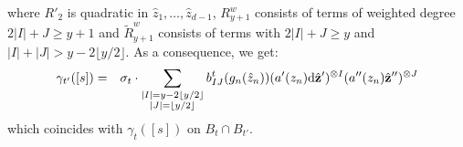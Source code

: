 \documentclass[12pt]{amsart}
\theoremstyle{definition}
\def\dif{{\rm d}}
\def\bz{{\mathbf{z}}}
\begin{document}
where $R'_2$ is quadratic in $\hat{z}_1,\dots, \hat{z}_{d-1}$, $R^w_{y+1}$ consists of terms of weighted degree $2|I|+J\ge y+1$ and $\tilde{R}^w_{y+1}$ consists of terms with $2|I|+J\ge y$ and $|I|+|J|>y-2\lfloor y/2\rfloor$.  
As a consequence, we get:
   \begin{eqnarray*}
    \gamma_{t'}([s])%
    &=&\sigma_t\cdot \sum_{\substack{|I|=y-2\lfloor y/2\rfloor\\ |J|=\lfloor y/2\rfloor}}b^t_{IJ}(g_n(\hat{z}_n))(a'(z_n)\dif\hat{\bz}')^{\otimes I} (a''(z_n)\hat{\bz}'')^{\otimes J}
\end{eqnarray*}
which coincides with $\gamma_t([s])$ on $B_t\cap B_{t'}$. 
\end{document}
